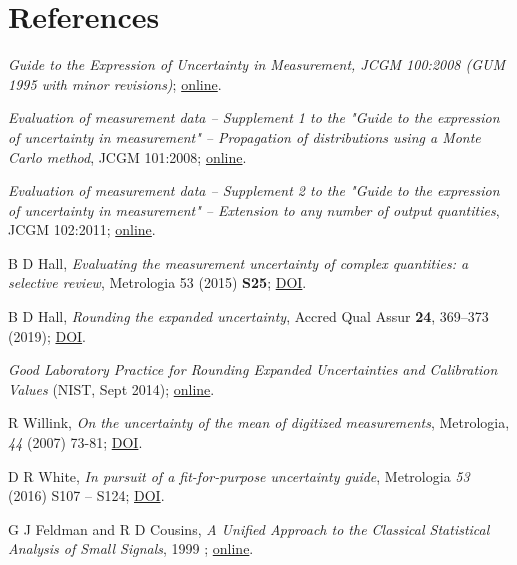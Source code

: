 \section{References}

\begingroup
\renewcommand{\section}[2]{}%

\begin{thebibliography}{99}
 \textit{Guide to the Expression of Uncertainty in Measurement, JCGM 100:2008 (GUM 1995 with minor revisions)}; \href{http://www.bipm.org/utils/common/documents/jcgm/JCGM_100_2008_E.pdf}{online}.

 \textit{Evaluation of measurement data – Supplement 1 to the "Guide to the expression of uncertainty in measurement" – Propagation of distributions using a Monte Carlo method}, JCGM 101:2008; \href{http://www.bipm.org/utils/common/documents/jcgm/JCGM_101_2008_E.pdf}{online}.
 
 \textit{Evaluation of measurement data – Supplement 2 to the "Guide to the expression of uncertainty in measurement" – Extension to any number of output quantities}, JCGM 102:2011; \href{http://www.bipm.org/utils/common/documents/jcgm/JCGM_102_2011_E.pdf}{online}.


B D Hall, \textit{Evaluating the measurement uncertainty of complex quantities: a selective review}, Metrologia 53 (2015) \textbf{S25}; \href{http://dx.doi.org/10.1088/0026-1394/53/1/S25}{DOI}.

B D Hall, \textit{Rounding the expanded uncertainty}, Accred Qual Assur \textbf{24}, 369–373 (2019); \href{https://doi.org/10.1007/s00769-019-01400-z}{DOI}.

\textit{Good Laboratory Practice for Rounding Expanded Uncertainties and Calibration Values} (NIST, Sept 2014); \href{http://www.nist.gov/pml/wmd/labmetrology/upload/GLP_9_20140911.pdf}{online}. 

R Willink, \textit{On the uncertainty of the mean of digitized measurements}, Metrologia, \textit{44} (2007) 73-81; \href{http://dx.doi.org/10.1088/0026-1394/44/1/011}{DOI}.

D R White, \textit{In pursuit of a fit-for-purpose uncertainty guide}, Metrologia \textit{53} (2016) S107 – S124; \href{http://dx.doi.org/10.1088/0026-1394/53/4/S107}{DOI}.

G J Feldman and R D Cousins, \textit{A Unified Approach to the Classical Statistical Analysis of Small Signals}, 1999 ; \href{http://arxiv.org/abs/physics/9711021/}{online}.

\end{thebibliography}
\endgroup